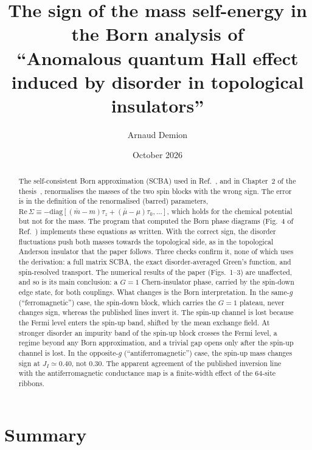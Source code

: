 \documentclass[11pt,a4paper]{article}
\title{The sign of the mass self-energy in the Born analysis of\\
``Anomalous quantum Hall effect induced by disorder in topological insulators''}
\author{Arnaud Demion}
\date{October 2026}
\begin{document}
\maketitle

\begin{abstract}
The self-consistent Born approximation (SCBA) used in Ref.~\cite{g2g1}, and in Chapter~2 of the
thesis~\cite{thesis}, renormalises the masses of the two spin blocks with the wrong sign. The
error is in the definition of the renormalised (barred) parameters,
$\mathrm{Re}\,\Sigma \equiv -\mathrm{diag}[(\bar m - m)\tau_z + (\bar\mu - \mu)\tau_0,\dots]$, which holds for
the chemical potential but not for the mass. The program that computed the Born phase diagrams
(Fig.~4 of Ref.~\cite{g2g1}) implements these equations as written. With the correct sign, the
disorder fluctuations push both masses towards the topological side, as in the topological
Anderson insulator that the paper follows. Three checks confirm it, none of which uses the
derivation:
a full matrix SCBA, the exact disorder-averaged Green's function, and spin-resolved transport. The
numerical results of the paper (Figs.~1--3) are unaffected, and so is its main conclusion: a
$G=1$ Chern-insulator phase, carried by the spin-down edge state, for both couplings. What changes
is the Born interpretation. In the same-$g$ (``ferromagnetic'') case, the spin-down block, which
carries the $G=1$ plateau, never changes sign, whereas the published lines invert it. The
spin-up channel is lost because the Fermi level enters the spin-up band, shifted by the mean
exchange field. At stronger disorder an impurity band of the spin-up block crosses the Fermi
level, a regime beyond any Born approximation, and a trivial gap opens only after the spin-up
channel is lost. In the opposite-$g$ (``antiferromagnetic'') case, the spin-up mass changes
sign at $J_I\simeq 0.40$, not $0.30$. The apparent agreement of the published inversion line
with the antiferromagnetic conductance map is a finite-width effect of the 64-site ribbons.
\end{abstract}

\tableofcontents

\section{Summary}
\end{document}

